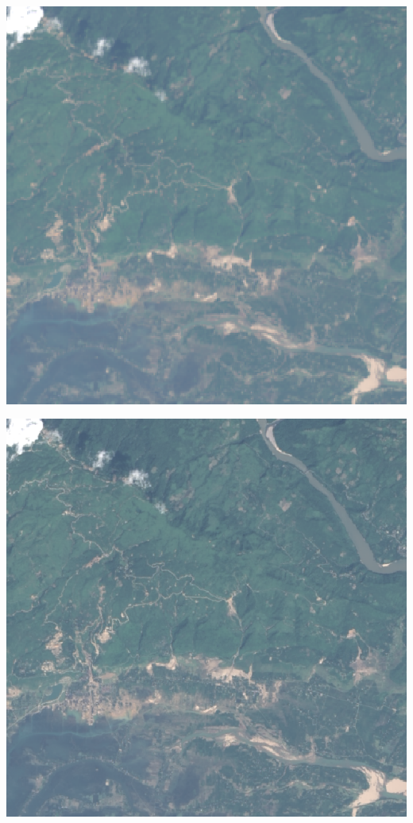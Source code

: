 \documentclass[12pt,a4paper]{article}
\begin{document}
\begin{center}\includegraphics{images/gdal/pansharpen_before} \end{center}

\begin{center}\includegraphics{images/gdal/pansharpen_after} \end{center}
\end{document}
